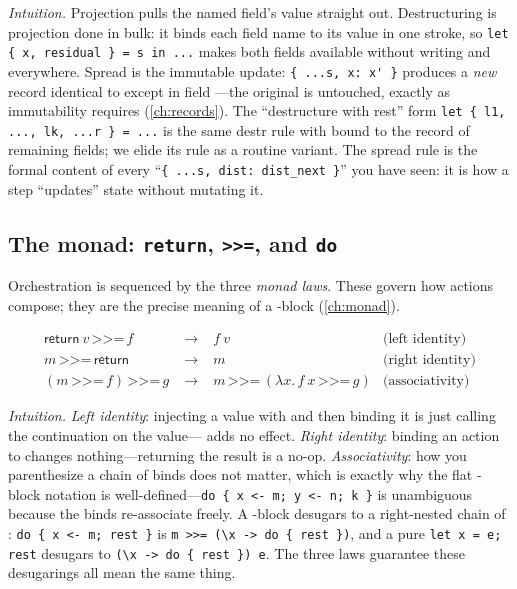 \noindent \emph{Intuition.} Projection  pulls the named field's value
straight out. Destructuring is projection done in bulk: it binds each field name
to its value in one stroke, so
\lstinline[style=l4style]|let { x, residual } = s in ...| makes both fields
available without writing  and  everywhere. Spread is
the immutable update: \lstinline[style=l4style]|{ ...s, x: x' }| produces a
\emph{new} record identical to  except in field ---the original
 is untouched, exactly as immutability requires (\cref{ch:records}). The
``destructure with rest'' form
\lstinline[style=l4style]|let { l1, ..., lk, ...r } = ...| is the same destr rule
with  bound to the record of remaining fields; we elide its rule as a
routine variant. The spread rule is the formal content of every
``\lstinline[style=l4style]|{ ...s, dist: dist_next }|'' you have seen: it is how
a step ``updates'' state without mutating it.

\subsection{The monad: \texttt{return}, \texttt{>>=}, and \texttt{do}}
\label{app:calc:monad}

Orchestration is sequenced by the three \emph{monad laws}. These govern how
 actions compose; they are the precise meaning of a -block
(\cref{ch:monad}).

\[
\begin{array}{rcll}
\textsf{return}\ v \,\mathbin{\texttt{>>=}}\, f &\;\to\;& f\ v & \text{(left identity)} \\[2pt]
m \,\mathbin{\texttt{>>=}}\, \textsf{return} &\;\to\;& m & \text{(right identity)} \\[2pt]
(m \,\mathbin{\texttt{>>=}}\, f) \,\mathbin{\texttt{>>=}}\, g
  &\;\to\;& m \,\mathbin{\texttt{>>=}}\, (\lambda x.\, f\ x \,\mathbin{\texttt{>>=}}\, g)
  & \text{(associativity)}
\end{array}
\]

\noindent \emph{Intuition.} \emph{Left identity}: injecting a value with
 and then binding it is just calling the continuation on the
value--- adds no effect. \emph{Right identity}: binding an action to
 changes nothing---returning the result is a no-op. \emph{Associativity}:
how you parenthesize a chain of binds does not matter, which is exactly why the
flat -block notation is well-defined---\lstinline[style=l4style]|do { x <- m; y <- n; k }|
is unambiguous because the binds re-associate freely. A -block desugars
to a right-nested chain of \code{>>=}: \lstinline[style=l4style]|do { x <- m; rest }|
is \lstinline[style=l4style]|m >>= (\x -> do { rest })|, and a pure
\lstinline[style=l4style]|let x = e; rest| desugars to
\lstinline[style=l4style]|(\x -> do { rest }) e|. The three laws guarantee these
desugarings all mean the same thing.


